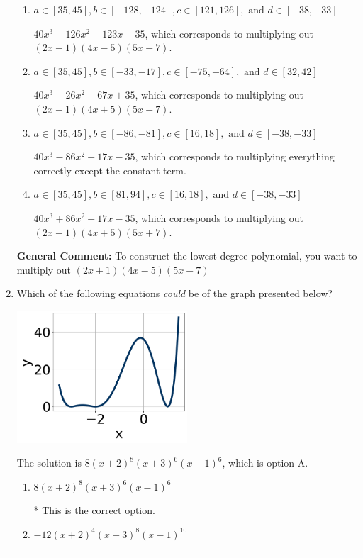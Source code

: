 \documentclass{extbook}[14pt]
\newcommand{\litem}[1]{\item #1

\rule{\textwidth}{0.4pt}}
\begin{document}
\begin{enumerate}
{\begin{enumerate}[label=\Alph*.]
* $40x^{3} -86 x^{2} +17 x + 35$, which is the correct option.
\item \( a \in [35, 45], b \in [-128, -124], c \in [121, 126], \text{ and } d \in [-38, -33] \)

$40x^{3} -126 x^{2} +123 x -35$, which corresponds to multiplying out $(2x -1)(4x -5)(5x -7)$.
\item \( a \in [35, 45], b \in [-33, -17], c \in [-75, -64], \text{ and } d \in [32, 42] \)

$40x^{3} -26 x^{2} -67 x + 35$, which corresponds to multiplying out $(2x -1)(4x + 5)(5x -7)$.
\item \( a \in [35, 45], b \in [-86, -81], c \in [16, 18], \text{ and } d \in [-38, -33] \)

$40x^{3} -86 x^{2} +17 x -35$, which corresponds to multiplying everything correctly except the constant term.
\item \( a \in [35, 45], b \in [81, 94], c \in [16, 18], \text{ and } d \in [-38, -33] \)

$40x^{3} +86 x^{2} +17 x -35$, which corresponds to multiplying out $(2x -1)(4x + 5)(5x + 7)$.
\end{enumerate}

\textbf{General Comment:} To construct the lowest-degree polynomial, you want to multiply out $(2x + 1)(4x -5)(5x -7)$
}
\litem{
Which of the following equations \textit{could} be of the graph presented below?

\begin{center}
    \includegraphics[width=0.5\textwidth]{../Figures/polyGraphToFunctionA.png}
\end{center}


The solution is \( 8(x + 2)^{8} (x + 3)^{6} (x - 1)^{6} \), which is option A.\begin{enumerate}[label=\Alph*.]
\item \( 8(x + 2)^{8} (x + 3)^{6} (x - 1)^{6} \)

* This is the correct option.
\item \( -12(x + 2)^{4} (x + 3)^{8} (x - 1)^{10} \)


\end{enumerate}}
\end{enumerate}
\end{document}
